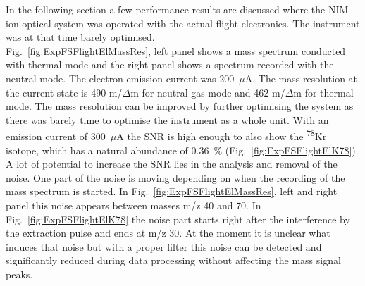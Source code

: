 		In the following section a few performance results are discussed where the NIM ion-optical system was operated with the actual flight electronics. The instrument was at that time barely optimised.\\
		Fig.~\ref{fig:ExpFSFlightElMassRes}, left panel shows a mass spectrum conducted with thermal mode and the right panel shows a spectrum recorded with the neutral mode. The electron emission current was 200~$\mu$A. The mass resolution at the current state is 490 m/$\Delta$m for neutral gas mode and 462 m/$\Delta$m for thermal mode. The mass resolution can be improved by further optimising the system as there was barely time to optimise the instrument as a whole unit. With an emission current of 300~$\mu$A the SNR is high enough to also show the \textsuperscript{78}Kr isotope, which has a natural abundance of 0.36~\% (Fig.~\ref{fig:ExpFSFlightElK78}).\\
		A lot of potential to increase the SNR lies in the analysis and removal of the noise. One part of the noise is moving depending on when the recording of the mass spectrum is started. In Fig.~\ref{fig:ExpFSFlightElMassRes}, left and right panel this noise appears between masses m/z 40 and 70. In Fig.~\ref{fig:ExpFSFlightElK78} the noise part starts right after the interference by the extraction pulse and ends at m/z 30. At the moment it is unclear what induces that noise but with a proper filter this noise can be detected and significantly reduced during data processing without affecting the mass signal peaks.\\
